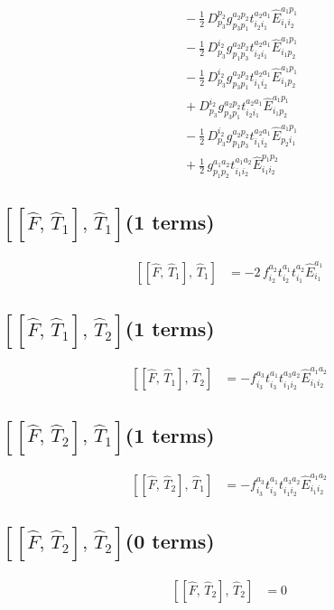 \documentclass[11pt]{article}
\begin{document}
\begin{align}
&\quad - \tfrac{1}{2}\, D^{p_{2}}_{p_{3}} g^{a_{2}p_{2}}_{p_{3}p_{1}} t^{a_{2}a_{1}}_{i_{2}i_{1}} \hat{E}^{a_{1}p_{1}}_{i_{1}i_{2}} \\
&\quad - \tfrac{1}{2}\, D^{i_{2}}_{p_{3}} g^{a_{2}p_{2}}_{p_{1}p_{3}} t^{a_{2}a_{1}}_{i_{2}i_{1}} \hat{E}^{a_{1}p_{1}}_{i_{1}p_{2}} \\
&\quad - \tfrac{1}{2}\, D^{i_{2}}_{p_{3}} g^{a_{2}p_{2}}_{p_{3}p_{1}} t^{a_{2}a_{1}}_{i_{1}i_{2}} \hat{E}^{a_{1}p_{1}}_{i_{1}p_{2}} \\
&\quad + D^{i_{2}}_{p_{3}} g^{a_{2}p_{2}}_{p_{3}p_{1}} t^{a_{2}a_{1}}_{i_{2}i_{1}} \hat{E}^{a_{1}p_{1}}_{i_{1}p_{2}} \\
&\quad - \tfrac{1}{2}\, D^{i_{2}}_{p_{3}} g^{a_{2}p_{2}}_{p_{1}p_{3}} t^{a_{2}a_{1}}_{i_{1}i_{2}} \hat{E}^{a_{1}p_{1}}_{p_{2}i_{1}} \\
&\quad + \tfrac{1}{2}\, g^{a_{1}a_{2}}_{p_{1}p_{2}} t^{a_{1}a_{2}}_{i_{1}i_{2}} \hat{E}^{p_{1}p_{2}}_{i_{1}i_{2}}
\end{align}
\subsection*{$\left[\left[\hat{F},\, \hat{T}_{1}\right],\, \hat{T}_{1}\right]$\quad(1 terms)}
\begin{align}
\left[\left[\hat{F},\, \hat{T}_{1}\right],\, \hat{T}_{1}\right] &= - 2\, f^{a_{2}}_{i_{2}} t^{a_{1}}_{i_{2}} t^{a_{2}}_{i_{1}} \hat{E}^{a_{1}}_{i_{1}}
\end{align}
\subsection*{$\left[\left[\hat{F},\, \hat{T}_{1}\right],\, \hat{T}_{2}\right]$\quad(1 terms)}
\begin{align}
\left[\left[\hat{F},\, \hat{T}_{1}\right],\, \hat{T}_{2}\right] &= - f^{a_{3}}_{i_{3}} t^{a_{1}}_{i_{3}} t^{a_{3}a_{2}}_{i_{1}i_{2}} \hat{E}^{a_{1}a_{2}}_{i_{1}i_{2}}
\end{align}
\subsection*{$\left[\left[\hat{F},\, \hat{T}_{2}\right],\, \hat{T}_{1}\right]$\quad(1 terms)}
\begin{align}
\left[\left[\hat{F},\, \hat{T}_{2}\right],\, \hat{T}_{1}\right] &= - f^{a_{3}}_{i_{3}} t^{a_{1}}_{i_{3}} t^{a_{3}a_{2}}_{i_{1}i_{2}} \hat{E}^{a_{1}a_{2}}_{i_{1}i_{2}}
\end{align}
\subsection*{$\left[\left[\hat{F},\, \hat{T}_{2}\right],\, \hat{T}_{2}\right]$\quad(0 terms)}
\begin{align}
\left[\left[\hat{F},\, \hat{T}_{2}\right],\, \hat{T}_{2}\right] &= 0
\end{align}
\end{document}
